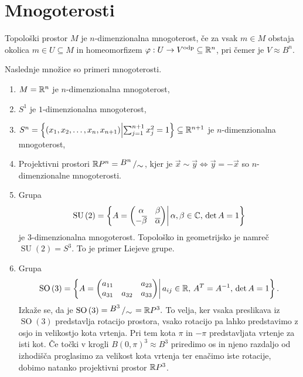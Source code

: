 % 


\section{Mnogoterosti}%

\begin{definicija}
\label{def_mnt}
Topološki prostor $M$
je $n$-dimenzionalna mnogoterost, če za vsak $m \in M$
obstaja okolica $m \in U \subseteq M$ in homeomorfizem
$\varphi : U \to V^{\text{odp}} \subseteq
\mathbb{R} ^n$, pri čemer je $V \approx B^{n}$.
\end{definicija}


\begin{primer}
Naslednje množice so primeri mnogoterosti.
\begin{enumerate}
	\item $M = \mathbb{R} ^n$ je
$n$-dimenzionalna mnogoterost,
	\item $S^1$ je
$1$-dimenzionalna mnogoterost,
  \item $S^{n} =
\left\{\left( x_1, x_2, \ldots, x_n, x_{n+1}
\right) \middle| \sum_{j=1}^{n+1} x_{j}^2 =
1\right\} \subseteq \mathbb{R} ^{n+1}$ je
$n$-dimenzionalna mnogoterost,
	\item Projektivni
prostori $\R P^{n} = \bigslant{B^{n}}{\sim} $,
kjer je $\vec{x} \sim \vec{y}  \iff \vec{y}  =
-\vec{x}$ so $n$-dimenzionalne mnogoterosti.
	\item Grupa \begin{equation*} \operatorname{SU}\left( 2 \right) = \left\{ A
= \begin{pmatrix}
\alpha & \beta \\ -
\overline{\beta}  & \overline{\alpha}  \\
\end{pmatrix}
\middle|\, \alpha, \beta \in  \mathbb{C} , \, \det
A = 1 \right\} 	\end{equation*}je $3$-dimenzionalna mnogoterost. Topološko in
geometrijsko je namreč $\operatorname{SU}\left( 2 \right) = S^3.$ To
je primer Liejeve grupe.
	\item Grupa \begin{equation*}
\operatorname{SO}\left( 3 \right) =
\left\{ A =
\begin{pmatrix} a_{11} &
& a_{23} \\ a_{31} & a_{32}
& a_{33} \\
\end{pmatrix}
\middle|\, a_{ij} \in \mathbb{R}  , \, A^{T} = A^{-1}, \, \det  A
= 1 \right\}. \end{equation*} Izkaže se, da je
$\operatorname{SO}\left( 3\right ) =
\bigslant{B^3}{\sim } = \R P^3.$ To
velja, ker vsaka preslikava iz
$\operatorname{SO}\left( 3\right )$
predstavlja rotacijo prostora, vsako
rotacijo pa lahko predstavimo z osjo in
velikostjo kota vrtenja. Pri tem kota $\pi$
in $-\pi$ predstavljata vrtenje za isti
kot. Če točki v krogli $B\left( 0, \pi
\right)^{3} \approx B^3$ priredimo os in njeno
razdaljo od izhodišča proglasimo za velikost kota vrtenja
ter enačimo iste rotacije, dobimo natanko projektivni prostor
$\mathbb{R} P^3$.
\end{enumerate}
\end{primer}

